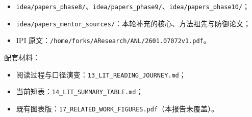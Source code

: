 \documentclass[11pt,a4paper]{ctexart}
\newcommand{\code}[1]{\texttt{#1}}
\begin{document}
\begin{itemize}[nosep,leftmargin=1.4em]
  \item \code{idea/papers\_phase8/}、\code{idea/papers\_phase9/}、\code{idea/papers\_phase10/}；
  \item \code{idea/papers\_mentor\_sources/}：本轮补充的核心、方法祖先与防御论文；
  \item IPI 原文：\code{/home/forks/AResearch/ANL/2601.07072v1.pdf}。
\end{itemize}

配套材料：

\begin{itemize}[nosep,leftmargin=1.4em]
  \item 阅读过程与口径演变：\code{13\_LIT\_READING\_JOURNEY.md}；
  \item 当前短表：\code{14\_LIT\_SUMMARY\_TABLE.md}；
  \item 既有图表版：\code{17\_RELATED\_WORK\_FIGURES.pdf}（本报告未覆盖）。
\end{itemize}
\normalsize
\end{document}
